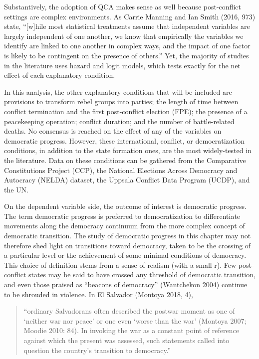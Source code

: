 \documentclass [11pt]{article}
\begin{document}
Substantively, the adoption of QCA makes sense as well because post-conflict settings are complex environments. As Carrie Manning and Ian Smith (2016, 973) state, ``[w]hile most statistical treatments assume that independent variables are largely independent of one another, we know that empirically the variables we identify are linked to one another in complex ways, and the impact of one factor is likely to be contingent on the presence of others.'' Yet, the majority of studies in the literature uses hazard and logit models, which tests exactly for the net effect of each explanatory condition.

In this analysis, the other explanatory conditions that will be included are provisions to transform rebel groups into parties; the length of time between conflict termination and the first post-conflict election (FPE); the presence of a peacekeeping operation; conflict duration; and the number of battle-related deaths. No consensus is reached on the effect of any of the variables on democratic progress. However, these international, conflict, or democratization conditions, in addition to the state formation ones, are the most widely-tested in the literature. Data on these conditions can be gathered from the Comparative Constitutions Project (CCP), the National Elections Across Democracy and Autocracy (NELDA) dataset, the Uppsala Conflict Data Program (UCDP), and the UN.

On the dependent variable side, the outcome of interest is democratic progress. The term democratic progress is preferred to democratization to differentiate movements along the democracy continuum from the more complex concept of democratic transition. The study of democratic progress in this chapter may not therefore shed light on transitions toward democracy, taken to be the crossing of a particular level or the achievement of some minimal conditions of democracy. This choice of definition stems from a sense of realism (with a small r). Few post-conflict states may be said to have crossed any threshold of democratic transition, and even those praised as ``beacons of democracy'' (Wantchekon 2004) continue to be shrouded in violence. In El Salvador (Montoya 2018, 4), 

\begin{quote}
\small
``ordinary Salvadorans often described the postwar moment as one of ‘neither war nor peace’ or one even ‘worse than the war’ (Montoya 2007; Moodie 2010: 84). In invoking the war as a constant point of reference against which the present was assessed, such statements called into question the country’s transition to democracy.''
\end{quote}
\end{document}
